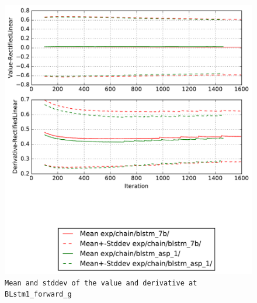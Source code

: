 \documentclass[prl,10pt,twocolumn]{revtex4}
\begin{document}
\newpage
\begin{figure}[h]
  \begin{center}
    \caption{\texttt{Mean and stddev of the value and derivative at BLstm1\_forward\_g}}
    \includegraphics[width=\textwidth]{exp/chain/blstm_7b/report/nonlinstats_BLstm1_forward_g.pdf}
  \end{center}
\end{figure}
\clearpage
\end{document}
